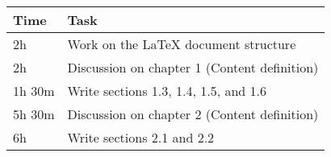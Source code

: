 \begin{center}
    {\renewcommand{\arraystretch}{2}%
    \begin{tabular}{L{2cm}L{12cm}}
        \hline
        \textbf{Time} & \textbf{Task} \\
        \hline
        2h & Work on the LaTeX document structure \\
        \hline
        2h & Discussion on chapter 1 (Content definition) \\
        \hline
        1h 30m& Write sections 1.3, 1.4, 1.5, and 1.6 \\
        \hline
        5h 30m & Discussion on chapter 2 (Content definition) \\
        \hline
        6h & Write sections 2.1 and 2.2
    \end{tabular}}
\end{center}